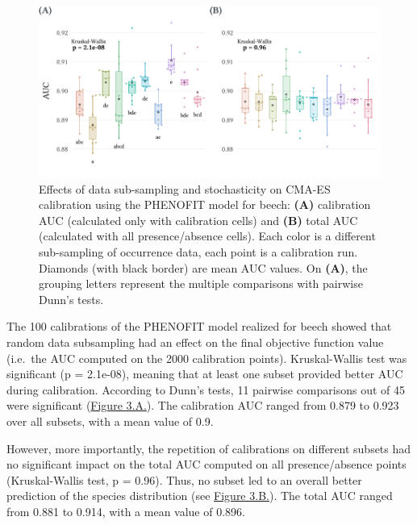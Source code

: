 \documentclass[11pt,]{article}
\begin{document}
\begin{figure}[H]

{\centering \includegraphics{figs/cmaesrepAUCcal} 

}

\caption{\label{fig:cmaesrepAUCcal} Effects of data sub-sampling and stochasticity on CMA-ES calibration using the PHENOFIT model for beech: \textbf{(A)} calibration AUC (calculated only with calibration cells) and \textbf{(B)} total AUC (calculated with all presence/absence cells). Each color is a different sub-sampling of occurrence data, each point is a calibration run. Diamonds (with black border) are mean AUC values. On \textbf{(A)}, the grouping letters represent the multiple comparisons with pairwise Dunn’s tests.}\label{fig:cmaesrepAUCcal}
\end{figure}

The 100 calibrations of the PHENOFIT model realized for beech showed
that random data subsampling had an effect on the final objective
function value (i.e.~the AUC computed on the 2000 calibration points).
Kruskal-Wallis test was significant (p = 2.1e-08), meaning that at least
one subset provided better AUC during calibration. According to Dunn's
tests, 11 pairwise comparisons out of 45 were significant
(\hyperref[fig:cmaesrepAUCcal]{Figure 3.A.}). The calibration AUC ranged
from 0.879 to 0.923 over all subsets, with a mean value of 0.9.

However, more importantly, the repetition of calibrations on different
subsets had no significant impact on the total AUC computed on all
presence/absence points (Kruskal-Wallis test, p = 0.96). Thus, no subset
led to an overall better prediction of the species distribution (see
\hyperref[fig:cmaesrepAUCcal]{Figure 3.B.}). The total AUC ranged from
0.881 to 0.914, with a mean value of 0.896. \newline
\end{document}
